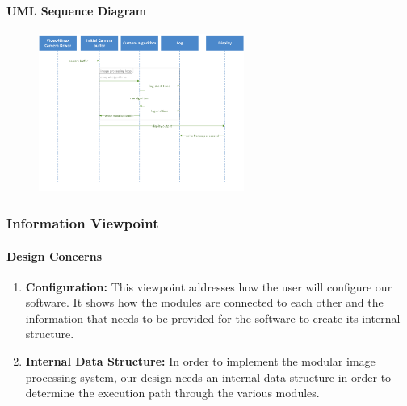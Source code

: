 	\paragraph{UML Sequence Diagram}
	\begin{figure}[H] %
		\centering
		\includegraphics[width=0.6\textwidth,natwidth=610,natheight=642]{images/UML_Diagram.png}  
		\end{figure}
	
\subsubsection{Information Viewpoint}
	\paragraph{Design Concerns}
	
	\begin{enumerate}[leftmargin=2cm,labelindent=2cm]
	\item \textbf{Configuration:}
	This viewpoint addresses how the user will configure our software. It shows how the modules are connected to each other and the information that 	needs to be provided for the software to create its internal structure.

	\item \textbf{Internal Data Structure:}
	In order to implement the modular image processing system, our design needs an internal data structure in order to determine the execution path 	through the various modules.\\
	\end{enumerate}
	
